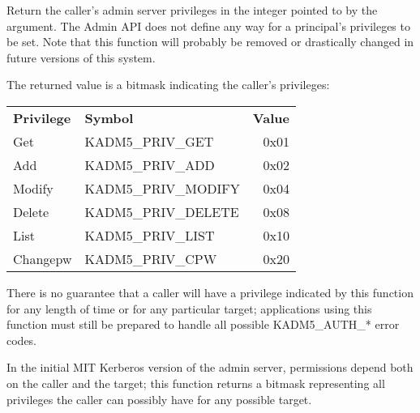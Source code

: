 Return the caller's admin server privileges in the integer pointed to
by the argument.  The Admin API does not define any way for a
principal's privileges to be set.  Note that this function will
probably be removed or drastically changed in future versions of this
system.

The returned value is a bitmask indicating the caller's privileges:

\begin{tabular}{llr}
{\bf Privilege} & {\bf Symbol} & {\bf Value} \\
Get & KADM5_PRIV_GET & 0x01 \\
Add & KADM5_PRIV_ADD & 0x02 \\
Modify & KADM5_PRIV_MODIFY & 0x04 \\
Delete & KADM5_PRIV_DELETE & 0x08 \\
List & KADM5_PRIV_LIST & 0x10 \\
Changepw & KADM5_PRIV_CPW & 0x20
\end{tabular}

There is no guarantee that a caller will have a privilege indicated by
this function for any length of time or for any particular target;
applications using this function must still be prepared to handle all
possible KADM5_AUTH_* error codes.

In the initial MIT Kerberos version of the admin server, permissions
depend both on the caller and the target; this function returns a
bitmask representing all privileges the caller can possibly have for
any possible target.


